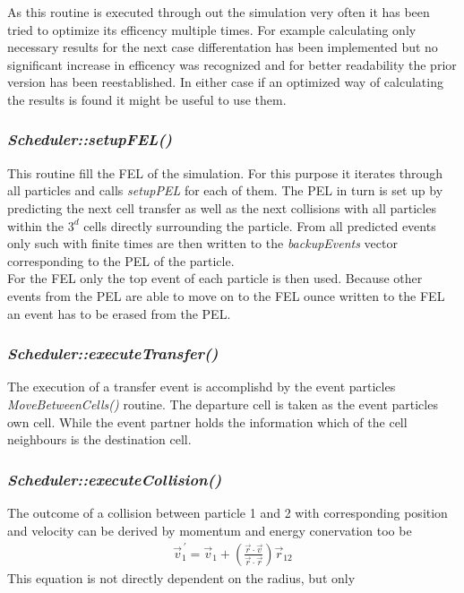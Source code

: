 As this routine is executed through out the simulation very often it has been tried to optimize its efficency multiple times. For example calculating only necessary results for the next case differentation has been implemented but no significant increase in efficency was recognized and for better readability the prior version has been reestablished. In either case if an optimized way of calculating the results is found it might be useful to use them.\\    

\subsubsection{\quad \textit{Scheduler::setupFEL()}}
This routine fill the FEL of the simulation. For this purpose it iterates through all particles and calls \textit{setupPEL} for each of them. The PEL in turn is set up by predicting the next cell transfer as well as the next collisions with all particles within the $3^d$ cells directly surrounding the particle. From all predicted events only such with finite times are then written to the \textit{backupEvents} vector corresponding to the PEL of the particle.\\
For the FEL only the top event of each particle is then used. Because other events from the PEL are able to move on to the FEL ounce written to the FEL an event has to be erased from the PEL.\\

\subsubsection{\quad \textit{Scheduler::executeTransfer()}}
The execution of a transfer event is accomplishd by the event particles \textit{MoveBetweenCells()} routine. The departure cell is taken as the event particles own cell. While the event partner holds the information which of the cell neighbours is the destination cell.\\

\subsubsection{\quad \textit{Scheduler::executeCollision()}}
The outcome of a collision between particle 1 and 2 with corresponding position and velocity can be derived by momentum and energy conervation  too be 
\begin{align}
\vec{v}_1^{\,'} = \vec{v}_1 + \left( \frac{\vec{r} \cdot \vec{v} }{\vec{r} \cdot \vec{r}} \right) \vec{r}_{12}
\end{align}
This equation is not directly dependent on the radius, but only  
 
